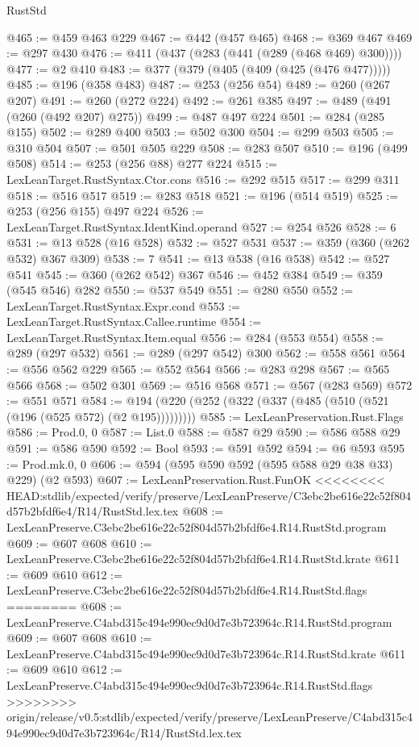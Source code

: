 \begin{lexlean}{RustStd}
\begin{coremodule}
{\begin{coremodule}
{{{{{{{{{{@465 := @459 @463 @229
@467 := @442 (@457 @465)
@468 := @369 @467
@469 := @297 @430
@476 := @411 (@437 (@283 (@441 (@289 (@468 @469) @300))))
@477 := @2 @410
@483 := @377 (@379 (@405 (@409 (@425 (@476 @477)))))
@485 := @196 (@358 @483)
@487 := @253 (@256 @54)
@489 := @260 (@267 @207)
@491 := @260 (@272 @224)
@492 := @261 @385
@497 := @489 (@491 (@260 (@492 @207) @275))
@499 := @487 @497 @224
@501 := @284 (@285 @155)
@502 := @289 @400
@503 := @502 @300
@504 := @299 @503
@505 := @310 @504
@507 := @501 @505 @229
@508 := @283 @507
@510 := @196 (@499 @508)
@514 := @253 (@256 @88) @277 @224
@515 := LexLeanTarget.RustSyntax.Ctor.cons
@516 := @292 @515
@517 := @299 @311
@518 := @516 @517
@519 := @283 @518
@521 := @196 (@514 @519)
@525 := @253 (@256 @155) @497 @224
@526 := LexLeanTarget.RustSyntax.IdentKind.operand
@527 := @254 @526
@528 := 6
@531 := @13 @528 (@16 @528)
@532 := @527 @531
@537 := @359 (@360 (@262 @532) @367 @309)
@538 := 7
@541 := @13 @538 (@16 @538)
@542 := @527 @541
@545 := @360 (@262 @542) @367
@546 := @452 @384
@549 := @359 (@545 @546) @282
@550 := @537 @549
@551 := @280 @550
@552 := LexLeanTarget.RustSyntax.Expr.cond
@553 := LexLeanTarget.RustSyntax.Callee.runtime
@554 := LexLeanTarget.RustSyntax.Item.equal
@556 := @284 (@553 @554)
@558 := @289 (@297 @532)
@561 := @289 (@297 @542) @300
@562 := @558 @561
@564 := @556 @562 @229
@565 := @552 @564
@566 := @283 @298
@567 := @565 @566
@568 := @502 @301
@569 := @516 @568
@571 := @567 (@283 @569)
@572 := @551 @571
@584 := @194 (@220 (@252 (@322 (@337 (@485 (@510 (@521 (@196 (@525 @572) (@2 @195)))))))))
@585 := LexLeanPreservation.Rust.Flags
@586 := Prod.{0, 0}
@587 := List.{0}
@588 := @587 @29
@590 := @586 @588 @29
@591 := @586 @590
@592 := Bool
@593 := @591 @592
@594 := @6 @593
@595 := Prod.mk.{0, 0}
@606 := @594 (@595 @590 @592 (@595 @588 @29 @38 @33) @229) (@2 @593)
@607 := LexLeanPreservation.Rust.FunOK
<<<<<<<< HEAD:stdlib/expected/verify/preserve/LexLeanPreserve/C3ebc2be616e22c52f804d57b2bfdf6e4/R14/RustStd.lex.tex
@608 := LexLeanPreserve.C3ebc2be616e22c52f804d57b2bfdf6e4.R14.RustStd.program
@609 := @607 @608
@610 := LexLeanPreserve.C3ebc2be616e22c52f804d57b2bfdf6e4.R14.RustStd.krate
@611 := @609 @610
@612 := LexLeanPreserve.C3ebc2be616e22c52f804d57b2bfdf6e4.R14.RustStd.flags
========
@608 := LexLeanPreserve.C4abd315c494e990ec9d0d7e3b723964c.R14.RustStd.program
@609 := @607 @608
@610 := LexLeanPreserve.C4abd315c494e990ec9d0d7e3b723964c.R14.RustStd.krate
@611 := @609 @610
@612 := LexLeanPreserve.C4abd315c494e990ec9d0d7e3b723964c.R14.RustStd.flags
>>>>>>>> origin/release/v0.5:stdlib/expected/verify/preserve/LexLeanPreserve/C4abd315c494e990ec9d0d7e3b723964c/R14/RustStd.lex.tex
}}}}}}}}}}
\end{coremodule}}
\end{coremodule}
\end{lexlean}
